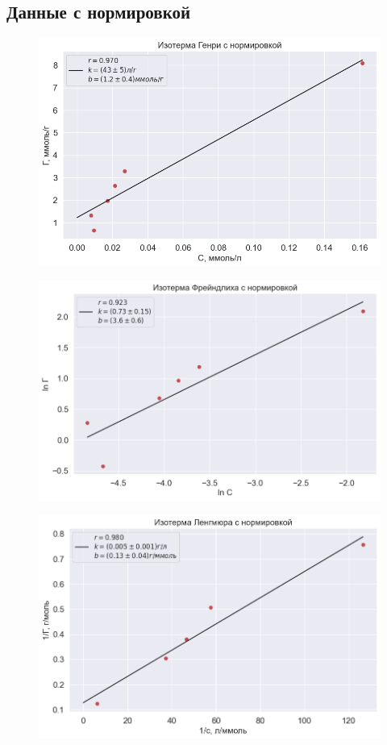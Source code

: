 \documentclass[a4paper,12pt]{article} %
\begin{document}
\subsection*{Данные с нормировкой}

\begin{figure}[H]
    \centering
    \includegraphics[width=17cm]{Henri_n.png}
    \label{Henri_n}
\end{figure}

\begin{figure}[H]
    \centering
    \includegraphics[width=17cm]{FR_n.png}
    \label{FR_n}
\end{figure}

\begin{figure}[H]
    \centering
    \includegraphics[width=17cm]{leng_n.png}
    \label{leng_n}
\end{figure}
\end{document}

